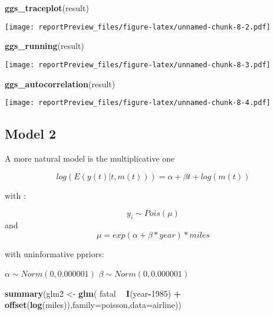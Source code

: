 \documentclass[]{article}
\newenvironment{Shaded}{\begin{snugshade}}{\end{snugshade}}
\newcommand{\KeywordTok}[1]{\textcolor[rgb]{0.13,0.29,0.53}{\textbf{#1}}}
\newcommand{\DataTypeTok}[1]{\textcolor[rgb]{0.13,0.29,0.53}{#1}}
\newcommand{\DecValTok}[1]{\textcolor[rgb]{0.00,0.00,0.81}{#1}}
\newcommand{\StringTok}[1]{\textcolor[rgb]{0.31,0.60,0.02}{#1}}
\newcommand{\OperatorTok}[1]{\textcolor[rgb]{0.81,0.36,0.00}{\textbf{#1}}}
\newcommand{\NormalTok}[1]{#1}
\begin{document}
\begin{Shaded}
\begin{Highlighting}[]
\KeywordTok{ggs_traceplot}\NormalTok{(result)}
\end{Highlighting}
\end{Shaded}

\texttt{[image: reportPreview\_files/figure-latex/unnamed-chunk-8-2.pdf]}

\begin{Shaded}
\begin{Highlighting}[]
\KeywordTok{ggs_running}\NormalTok{(result)}
\end{Highlighting}
\end{Shaded}

\texttt{[image: reportPreview\_files/figure-latex/unnamed-chunk-8-3.pdf]}

\begin{Shaded}
\begin{Highlighting}[]
\KeywordTok{ggs_autocorrelation}\NormalTok{(result)}
\end{Highlighting}
\end{Shaded}

\texttt{[image: reportPreview\_files/figure-latex/unnamed-chunk-8-4.pdf]}

\subsection{Model 2}\label{model-2}

A more natural model is the multiplicative one

\[log(E(y(t)|t,m(t))) = \alpha + \beta t + log(m(t))\]

with :

\[y_i \sim Pois(\mu)\] and \[\mu = exp(\alpha + \beta * year ) * miles\]

with uninformative ppriors:

\(\alpha \sim Norm(0,0.000001)\) \(\beta \sim Norm(0,0.000001)\)

\begin{Shaded}
\begin{Highlighting}[]
\KeywordTok{summary}\NormalTok{(glm2 <-}\StringTok{ }\KeywordTok{glm}\NormalTok{( fatal }\OperatorTok{~}\StringTok{ }\KeywordTok{I}\NormalTok{(year}\OperatorTok{-}\DecValTok{1985}\NormalTok{) }\OperatorTok{+}\StringTok{ }\KeywordTok{offset}\NormalTok{(}\KeywordTok{log}\NormalTok{(miles)),}\DataTypeTok{family=}\NormalTok{poisson,}\DataTypeTok{data=}\NormalTok{airline)) }
\end{Highlighting}
\end{Shaded}
\end{document}
